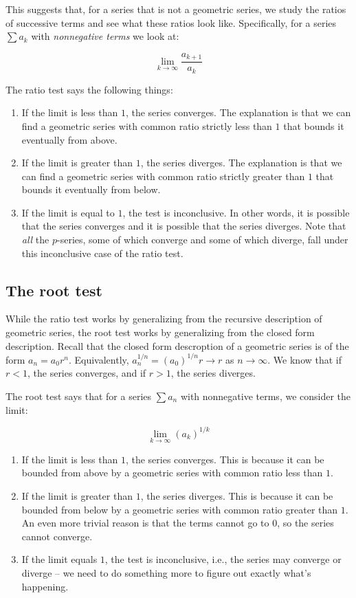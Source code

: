\documentclass[10pt]{amsart}
\begin{document}
This suggests that, for a series that is not a geometric series, we
study the ratios of successive terms and see what these ratios look
like. Specifically, for a series $\sum a_k$ with {\em nonnegative
terms} we look at:

$$\lim_{k \to \infty} \frac{a_{k+1}}{a_k}$$

The ratio test says the following things:

\begin{enumerate}
\item If the limit is less than $1$, the series converges. The
  explanation is that we can find a geometric series with common ratio
  strictly less than $1$ that bounds it eventually from above.
\item If the limit is greater than $1$, the series diverges. The
  explanation is that we can find a geometric series with common ratio
  strictly greater than $1$ that bounds it eventually from below.
\item If the limit is equal to $1$, the test is inconclusive. In other
  words, it is possible that the series converges and it is possible
  that the series diverges. Note that {\em all} the $p$-series, some
  of which converge and some of which diverge, fall under this
  inconclusive case of the ratio test.
\end{enumerate}

\subsection{The root test}

While the ratio test works by generalizing from the recursive
description of geometric series, the root test works by generalizing
from the closed form description. Recall that the closed form
descroption of a geometric series is of the form $a_n =
a_0r^n$. Equivalently, $a_n^{1/n} = (a_0)^{1/n}r \to r$ as $n \to
\infty$. We know that if $r < 1$, the series converges, and if $r >
1$, the series diverges.

The root test says that for a series $\sum a_n$ with nonnegative
terms, we consider the limit:

$$\lim_{k \to \infty} (a_k)^{1/k}$$

\begin{enumerate}
\item If the limit is less than $1$, the series converges. This is
  because it can be bounded from above by a geometric series with
  common ratio less than $1$.
\item If the limit is greater than $1$, the series diverges. This is
  because it can be bounded from below by a geometric series with
  common ratio greater than $1$. An even more trivial reason is that
  the terms cannot go to $0$, so the series cannot converge.
\item If the limit equals $1$, the test is inconclusive, i.e., the
  series may converge or diverge -- we need to do something more to
  figure out exactly what's happening.
\end{enumerate}
\end{document}

